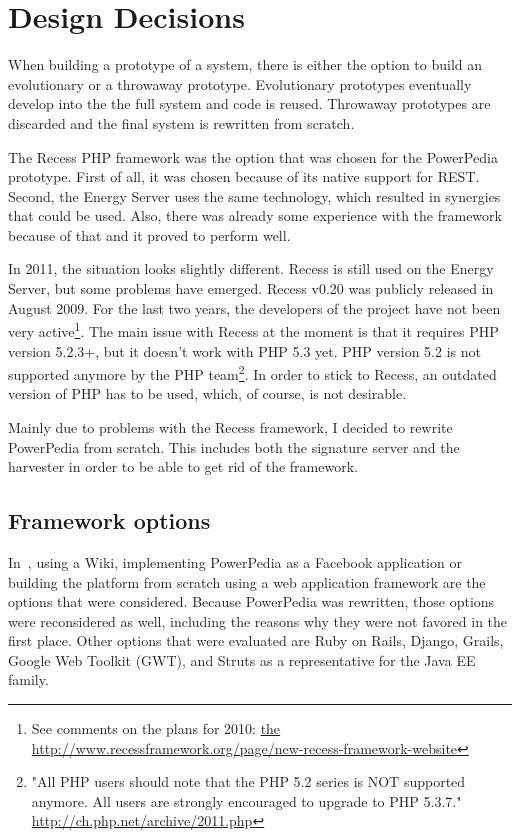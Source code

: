 \section{Design Decisions}
When building a prototype of a system, there is either the option to build an evolutionary or a throwaway prototype. Evolutionary prototypes eventually develop into the the full system \cite{interactive_systems} and code is reused. Throwaway prototypes are discarded and the final system is rewritten from scratch. 

The Recess PHP framework was the option that was chosen for the PowerPedia prototype. First of all, it was chosen because of its native support for REST. Second, the Energy Server uses the same technology, which resulted in synergies that could be used. Also, there was already some experience with the framework because of that and it proved to perform well.

In 2011, the situation looks slightly different. Recess is still used on the Energy Server, but some problems have emerged. Recess v0.20 was publicly released in August 2009. For the last two years, the developers of the project have not been very active\footnote{See comments on the plans for 2010: \url{the http://www.recessframework.org/page/new-recess-framework-website}}. The main issue with Recess at the moment is that it requires PHP version 5.2.3+, but it doesn't work with PHP 5.3 yet. PHP version 5.2 is not supported anymore by the PHP team\footnote{"All PHP users should note that the PHP 5.2 series is NOT supported anymore. All users are strongly encouraged to upgrade to PHP 5.3.7." \url{http://ch.php.net/archive/2011.php}}. In order to stick to Recess, an outdated version of PHP has to be used, which, of course, is not desirable.  

Mainly due to problems with the Recess framework, I decided to rewrite PowerPedia from scratch. This includes both the signature server and the harvester in order to be able to get rid of the framework. 

\subsection{Framework options}
In~\cite{merklepp}, using a Wiki, implementing PowerPedia as a Facebook application or building the platform from scratch using a web application framework are the options that were considered. 
Because PowerPedia was rewritten, those options were reconsidered as well, including the reasons why they were not favored in the first place. Other options that were evaluated are Ruby on Rails, Django, Grails, Google Web Toolkit (GWT), and Struts as a representative for the Java EE family.    

